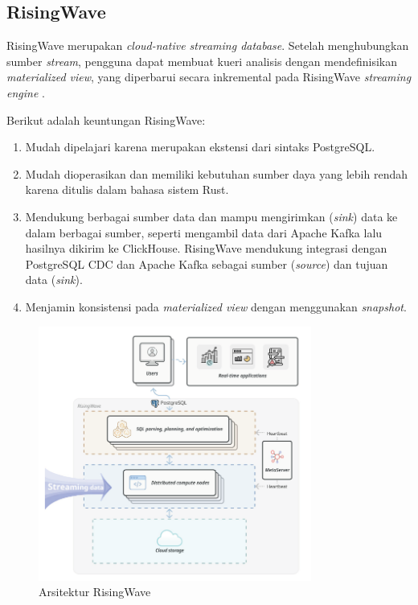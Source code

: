 \subsection{RisingWave}

RisingWave merupakan \textit{cloud-native streaming database}. Setelah menghubungkan sumber \textit{stream}, pengguna dapat membuat kueri analisis dengan mendefinisikan \textit{materialized view}, yang diperbarui secara inkremental pada RisingWave \textit{streaming engine} \parencite{risingwave}.

Berikut adalah keuntungan RisingWave:

\begin{enumerate}
    \item Mudah dipelajari karena merupakan ekstensi dari sintaks PostgreSQL.
    \item Mudah dioperasikan dan memiliki kebutuhan sumber daya yang lebih rendah karena ditulis dalam bahasa sistem Rust.
    \item Mendukung berbagai sumber data dan mampu mengirimkan (\textit{sink}) data ke dalam berbagai sumber, seperti mengambil data dari Apache Kafka lalu hasilnya dikirim ke ClickHouse. RisingWave mendukung integrasi dengan PostgreSQL CDC dan Apache Kafka sebagai sumber (\textit{source}) dan tujuan data (\textit{sink}).
    \item Menjamin konsistensi pada \textit{materialized view} dengan menggunakan \textit{snapshot}.
\end{enumerate}

\begin{figure}[htbp]
    \centering
    \includegraphics[width=0.8\textwidth]{resources/chapter-2/risingwave.png}
    \caption{Arsitektur RisingWave \parencite{risingwave}}
    \label{fig:risingwave-architecture}
\end{figure}

